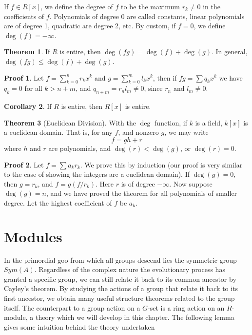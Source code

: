 \documentclass[12pt]{amsbook}
\theoremstyle{definition}
\newtheorem{theorem}{Theorem}[chapter]
\newtheorem{corollary}[theorem]{Corollary}
\newtheorem*{prf}{Proof}
\begin{document}
If $f \in R[x]$, we define the degree of $f$ to be the maximum $r_k \neq 0$ in the coefficients of $f$. Polynomials of degree 0 are called constants, linear polynomials are of degree 1, quadratic are degree 2, etc. By custom, if $f = 0$, we define $\deg(f) = -\infty$.

\begin{theorem}
    If $R$ is entire, then $\deg(fg) = \deg(f) + \deg(g)$. In general, $\deg(fg) \leq \deg(f) + \deg(g)$.
\end{theorem}
\begin{prf}
    Let $f = \sum_{k = 0}^n r_kx^k$ and $g = \sum_{k = 0}^m l_kx^k$, then if $fg = \sum q_kx^k$ we have $q_k = 0$ for all $k > n + m$, and $q_{n + m} = r_nl_m \neq 0$, since $r_n$ and $l_m \neq 0$.
\end{prf}

\begin{corollary}
    If $R$ is entire, then $R[x]$ is entire.
\end{corollary}

\begin{theorem}[Euclidean Division]
    With the $\deg$ function, if $k$ is a field, $k[x]$ is a euclidean domain. That is, for any $f$, and nonzero $g$, we may write
    \[ f = gh + r \]
    where $h$ and $r$ are polynomials, and $\deg(r) < \deg(g)$, or $\deg(r) = 0$.
\end{theorem}
\begin{prf}
    Let $f = \sum a_kr_k$. We prove this by induction (our proof is very similar to the case of showing the integers are a euclidean domain). If $\deg(g) = 0$, then $g = r_k$, and $f = g(f/r_k)$. Here $r$ is of degree $-\infty$. Now suppose $\deg(g) = n$, and we have proved the theorem for all polynomials of smaller degree. Let the highest coefficient of $f$ be $a_k$.
\end{prf}


\chapter{Modules}

In the primordial goo from which all groups descend lies the symmetric group $Sym(A)$. Regardless of the complex nature the evolutionary process has granted a specific group, we can still relate it back to its common ancestor by Cayley's theorem. By studying the actions of a group that relate it back to its first ancestor, we obtain many useful structure theorems related to the group itself. The counterpart to a group action on a $G$-set is a ring action on an $R$-module, a theory which we will develop in this chapter. The following lemma gives some intuition behind the theory undertaken
\end{document}
